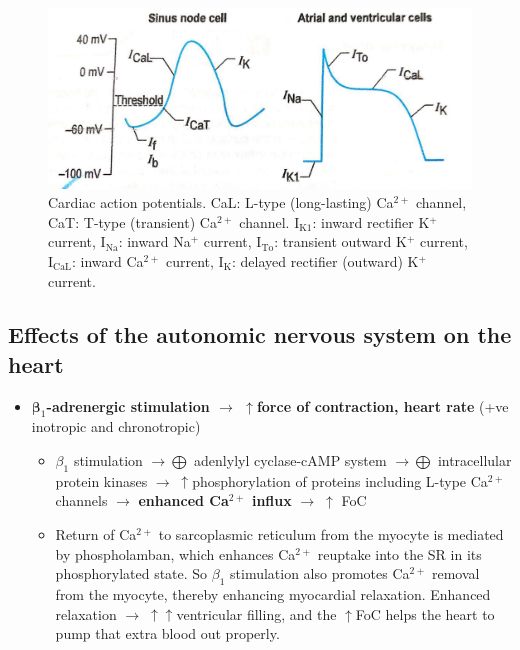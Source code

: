 \documentclass[
  12pt,
]{memoir}
\providecommand{\tightlist}{%
  \setlength{\itemsep}{0pt}\setlength{\parskip}{0pt}}
\begin{document}
\begin{figure}[h!]
    \centering
    \includegraphics[width=.7\textwidth]{../assets/med/sa-node-myocyte-ap.jpg}
    \vspace{4mm}
    \caption{Cardiac action potentials. CaL: L-type (long-lasting) Ca$^{2+}$
     channel, CaT: T-type (transient) Ca$^{2+}$ channel. 
     I$_{\text{K1}}$: inward rectifier K$^+$ current,
     I$_{\text{Na}}$: inward Na$^+$ current, 
     I$_{\text{To}}$: transient outward K$^+$ current,
     I$_{\text{CaL}}$: inward Ca$^{2+}$ current,
     I$_{\text{K}}$: delayed rectifier (outward) K$^+$ current. }
     \label{fig:heart-ap}
\end{figure}

\hypertarget{effects-of-the-autonomic-nervous-system-on-the-heart}{%
\subsection{Effects of the autonomic nervous system on the
heart}\label{effects-of-the-autonomic-nervous-system-on-the-heart}}

\begin{itemize}
\tightlist
\item
  \textbf{\(\boldsymbol\beta_1\)-adrenergic stimulation \(\rightarrow\)
  \(\uparrow\)force of contraction, heart rate} (+ve inotropic and
  chronotropic)

  \begin{itemize}
  \tightlist
  \item
    \(\beta_1\) stimulation \(\rightarrow\bigoplus\) adenlylyl
    cyclase-cAMP system \(\rightarrow\bigoplus\) intracellular protein
    kinases \(\rightarrow\;\uparrow\)phosphorylation of proteins
    including L-type Ca\(^{2+}\) channels \(\rightarrow\)
    \textbf{enhanced Ca\(^{2+}\) influx} \(\rightarrow\;\uparrow\) FoC
  \item
    Return of Ca\(^{2+}\) to sarcoplasmic reticulum from the myocyte is
    mediated by phospholamban, which enhances Ca\(^{2+}\) reuptake into
    the SR in its phosphorylated state. So \(\beta_1\) stimulation also
    promotes Ca\(^{2+}\) removal from the myocyte, thereby enhancing
    myocardial relaxation. Enhanced relaxation
    \(\rightarrow\;  \uparrow\uparrow\)ventricular filling, and the
    \(\uparrow\)FoC helps the heart to pump that extra blood out
    properly.
  \end{itemize}
\end{itemize}
\end{document}
